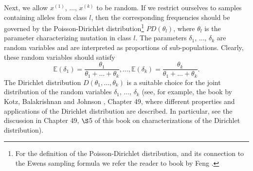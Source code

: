 \documentclass[12pt]{amsart}
\theoremstyle{definition}
\numberwithin{equation}{section}
\begin{document}
Next, we allow $x^{(1)}$, $\ldots$, $x^{(k)}$ to be random. If we restrict ourselves to samples containing alleles from class $l$, then the corresponding frequencies should be governed by the Poisson-Dirichlet  distribution\footnote{For the definition of the Poisson-Dirichlet distribution, and its connection
to the Ewens sampling formula we refer the reader to book by Feng \cite{Feng}.} $PD(\theta_l)$, where $\theta_l$ is the parameter characterizing mutation in class $l$. The parameters $\delta_1$, $\ldots$, $\delta_k$ are random variables and are interpreted as proportions of sub-populations.
Clearly, these random variables should satisfy
\begin{equation}
\mathbb{E}\left(\delta_1\right)=\frac{\theta_1}{\theta_1+\ldots+\theta_k},\ldots,\mathbb{E}\left(\delta_k\right)=\frac{\theta_k}{\theta_1+\ldots+\theta_k}.
\end{equation}
The Dirichlet distribution $D\left(\theta_1,\ldots,\theta_k\right)$ is a suitable choice for the joint distribution of the random variables $\delta_1$, $\ldots$, $\delta_k$ (see, for example,
the book by Kotz, Balakrishnan and Johnson \cite{KotzBalakrishnanJohnson}, Chapter 49,  where different properties and applications of the Dirichlet distribution are described. In particular,   see the discussion in Chapter 49, $\S$5 of this book on characterizations of the Dirichlet distribution).
\end{document}
